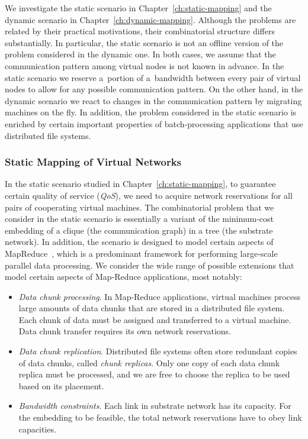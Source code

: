 We investigate the static scenario in Chapter~\ref{ch:static-mapping} and the dynamic scenario in Chapter~\ref{ch:dynamic-mapping}.
Although the problems are related by their practical motivations, their combinatorial structure differs substantially.
In particular, the static scenario is not an offline version of the problem considered in the dynamic one.
In both cases, we assume that the communication pattern among virtual nodes is not known in advance.
In the static scenario we reserve a~portion of a~bandwidth between every pair of virtual nodes to allow for any possible communication pattern.
On the other hand, in the dynamic scenario we react to changes in the communication pattern by migrating machines on the fly.
In addition, the problem considered in the static scenario is enriched by certain important properties of batch-processing applications that use distributed file systems.


\subsubsection{Static Mapping of Virtual Networks}
\label{sec:contributions-static-mapping}

In the static scenario studied in Chapter~\ref{ch:static-mapping}, to guarantee certain quality of service (\emph{QoS}), we need to acquire network reservations for all pairs of cooperating virtual machines.
The combinatorial problem that we consider in the static scenario is essentially a variant of the minimum-cost embedding of a clique (the communication graph) in a tree (the substrate network).
In addition, the scenario is designed to model certain aspects of MapReduce~\cite{mapreduce}, which is a predominant framework for performing large-scale parallel data processing.
We consider the wide range of possible extensions that model certain aspects of Map-Reduce applications, most notably:

\begin{itemize}
\item \emph{Data chunk processing}. In Map-Reduce applications, virtual machines process large amo\-unts of data chunks that are stored in a distributed file system. Each chunk of data must be assigned and transferred to a virtual machine. Data chunk transfer requires its own network reservations.

\item \emph{Data chunk replication}. Distributed file systems often store redundant copies of data chunks, called \emph{chunk replicas}. Only one copy of each data chunk replica must be processed, and we are free to choose the replica to be used based on its placement.

\item \emph{Bandwidth constraints}. Each link in substrate network has its capacity. For the embedding to be feasible, the total network reservations have to obey link capacities.
\end{itemize}


